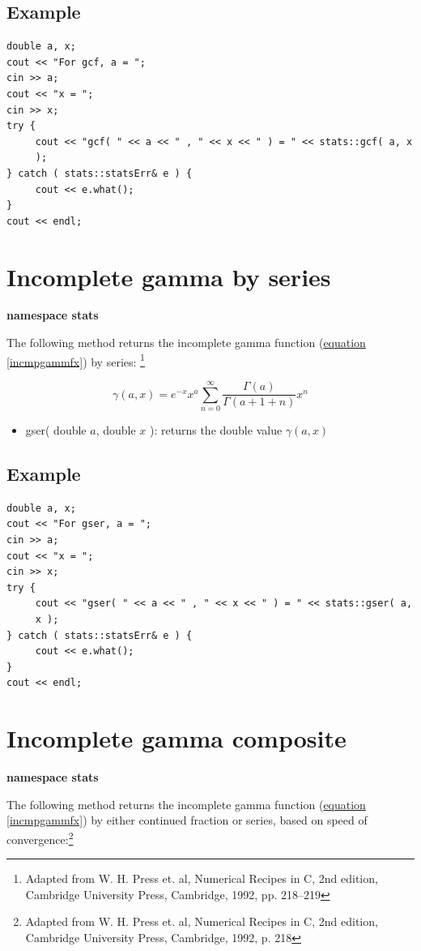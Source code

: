 \documentclass{report}
\begin{document}
\subsection{Example}
\begin{verbatim}
double a, x;
cout << "For gcf, a = ";
cin >> a;
cout << "x = ";
cin >> x;
try {
     cout << "gcf( " << a << " , " << x << " ) = " << stats::gcf( a, x
     );
} catch ( stats::statsErr& e ) {
     cout << e.what();
}
cout << endl;
\end{verbatim}

\section{Incomplete gamma by series}

{\bf namespace stats}

The following method returns the incomplete gamma function
(\hyperref[incmpgammfx]{equation \ref{incmpgammfx}}) by series:
\footnote{Adapted from W. H. Press et. al, Numerical Recipes in C, 2nd
edition, Cambridge University Press, Cambridge, 1992, pp. 218--219}

\begin{equation}
\gamma(a,x) = e^{-x}x^a \sum_{n=0}^\infty \frac{\Gamma(a)}{\Gamma(a+1+
n)}x^n
\end{equation}

\begin{itemize}
\item gser( double $a$, double $x$ ): returns the double value
$\gamma(a,x)$
\end{itemize}

\subsection{Example}
\begin{verbatim}
double a, x;
cout << "For gser, a = ";
cin >> a;
cout << "x = ";
cin >> x;
try {
     cout << "gser( " << a << " , " << x << " ) = " << stats::gser( a,
     x );
} catch ( stats::statsErr& e ) {
     cout << e.what();
}
cout << endl;
\end{verbatim}

\section{Incomplete gamma composite}

{\bf namespace stats}

The following method returns the incomplete gamma function
(\hyperref[incmpgammfx]{equation \ref{incmpgammfx}}) by either
continued fraction or series, based on speed of convergence:\footnote{
Adapted from W. H. Press et. al, Numerical Recipes in C, 2nd edition,
Cambridge University Press, Cambridge, 1992, p. 218}
\end{document}
